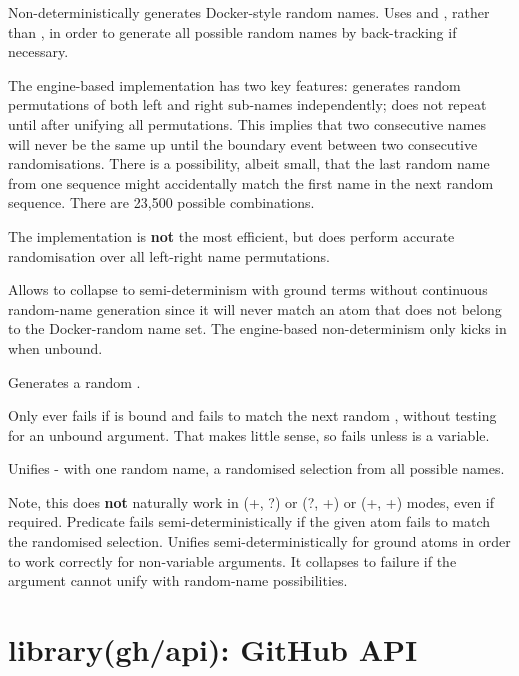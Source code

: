 \begin{description}
Non-deterministically generates Docker-style random names. Uses
 and , rather than , in
order to generate all possible random names by back-tracking if
necessary.

The engine-based implementation has two key features: generates
random permutations of both left and right sub-names independently;
does not repeat until after unifying all permutations. This implies
that two consecutive names will never be the same up until the
boundary event between two consecutive randomisations. There is a
possibility, albeit small, that the last random name from one
sequence might accidentally match the first name in the next random
sequence. There are 23,500 possible combinations.

The implementation is \textbf{not} the most efficient, but does perform
accurate randomisation over all left-right name permutations.

Allows  to collapse to semi-determinism with ground terms
without continuous random-name generation since it will never match
an atom that does not belong to the Docker-random name set. The
engine-based non-determinism only kicks in when  unbound.

Generates a random .

Only ever fails if  is bound and fails to match the next random
, without testing for an unbound argument. That makes little
sense, so fails unless  is a variable.

Unifies - with one random name, a randomised selection from
all possible names.

Note, this does \textbf{not} naturally work in (+, ?) or (?, +) or (+, +)
modes, even if required. Predicate  fails
semi-deterministically if the given atom fails to match the
randomised selection. Unifies semi-deterministically for ground
atoms in order to work correctly for non-variable arguments. It
collapses to failure if the argument cannot unify with random-name
possibilities.
\end{description}

\chapter{library(gh/api): GitHub API}\label{sec:api}

